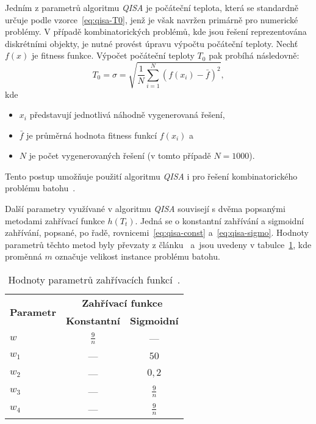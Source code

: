 Jedním z parametrů algoritmu \emph{QISA} je počáteční teplota, která se standardně určuje podle vzorce~\ref{eq:qisa-T0}, jenž je však navržen primárně pro numerické problémy. 
V případě kombinatorických problémů, kde jsou řešení reprezentována diskrétními objekty, je nutné provést úpravu výpočtu počáteční teploty. 
Nechť $f\left(x\right)$ je fitness funkce. Výpočet počáteční teploty $T_0$ pak probíhá následovně:
\begin{equation*}\label{eq:qisa-std}
    T_0 = \sigma = \sqrt{\frac{1}{N}\sum_{i=1}^{N}\left( f\left(x_i\right) - \bar{f}\right)^2},
\end{equation*}
kde
\begin{itemize}
    \item $x_i$ představují jednotlivá náhodně vygenerovaná řešení,
    \item $\bar{f}$ je průměrná hodnota fitness funkcí $f\left(x_i\right)$ a
    \item $N$ je počet vygenerovaných řešení (v tomto případě $N=1000$).
\end{itemize}
Tento postup umožňuje použití algoritmu \emph{QISA} i pro řešení kombinatorického problému batohu~\cite{qisa,FundamentalsOfProbability}. 

Další parametry využívané v algoritmu \emph{QISA} souvisejí s dvěma popsanými metodami zahřívací funkce $h\left(T_t\right)$. 
Jedná se o konstantní zahřívání a sigmoidní zahřívání, popsané, po řadě, rovnicemi~\ref{eq:qisa-const} a~\ref{eq:qisa-sigmo}. 
Hodnoty parametrů těchto metod byly převzaty z článku~\cite{qisa} a~jsou uvedeny v tabulce~\ref{tab:qisa-heating-params}, kde proměnná $m$ označuje velikost instance problému batohu.
\begin{table}[ht]
    \centering
    \begin{tabular}{lcc}
      \toprule
      \multirow{2}{*}{\textbf{Parametr}}  & \multicolumn{2}{c}{\textbf{Zahřívací funkce}} \\
      \cmidrule(lr){2-3}
            & \textbf{Konstantní}  & \textbf{Sigmoidní} \\
      \midrule
      $w$   & $\frac{9}{n}$        & ---                \\[1ex]
      $w_1$ & ---                  & $50$               \\[1ex]
      $w_2$ & ---                  & $0,2$              \\[1ex]
      $w_3$ & ---                  & $\frac{9}{n}$      \\[1ex]
      $w_4$ & ---                  & $\frac{9}{n}$      \\
      \bottomrule
    \end{tabular}
    \caption{Hodnoty parametrů zahřívacích funkcí~\cite{qisa}.}
    \label{tab:qisa-heating-params}
\end{table}

